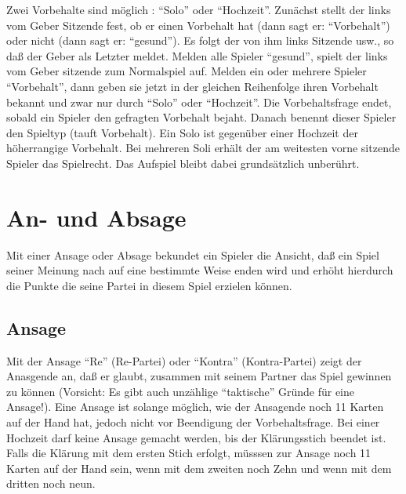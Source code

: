 \documentclass[12pt]{scrartcl}
\begin{document}
Zwei Vorbehalte sind möglich : "`Solo"' oder "`Hochzeit"'. Zunächst stellt der links vom Geber Sitzende fest, ob er einen Vorbehalt hat (dann sagt er: "`Vorbehalt"') oder nicht (dann sagt er: "`gesund"'). Es folgt der von ihm links Sitzende usw., so daß der Geber als Letzter meldet. Melden alle Spieler "`gesund"', spielt der links vom Geber sitzende zum Normalspiel auf. Melden ein oder mehrere Spieler "`Vorbehalt"', dann geben sie jetzt in der gleichen Reihenfolge ihren Vorbehalt bekannt und zwar nur durch "`Solo"' oder "`Hochzeit"'. Die Vorbehaltsfrage endet, sobald ein Spieler den gefragten Vorbehalt bejaht. Danach benennt dieser Spieler den Spieltyp (tauft Vorbehalt). Ein Solo ist gegenüber einer Hochzeit der höherrangige Vorbehalt. Bei mehreren Soli erhält der am weitesten vorne sitzende Spieler das Spielrecht. Das Aufspiel bleibt dabei grundsätzlich unberührt.

\section{An- und Absage}
Mit einer Ansage oder Absage bekundet ein Spieler die Ansicht, daß ein Spiel seiner Meinung nach auf eine bestimmte Weise enden wird und erhöht hierdurch die Punkte die seine Partei in diesem Spiel erzielen können.

\subsection{Ansage}
Mit der Ansage "`Re"' (Re-Partei) oder "`Kontra"' (Kontra-Partei) zeigt der Anasgende an, daß er glaubt, zusammen mit seinem Partner das Spiel gewinnen zu können (Vorsicht: Es gibt auch unzählige "`taktische"' Gründe für eine Ansage!). Eine Ansage ist solange möglich, wie der Ansagende noch 11 Karten auf der Hand hat, jedoch nicht vor Beendigung der Vorbehaltsfrage. Bei einer Hochzeit darf keine Ansage gemacht werden, bis der Klärungsstich beendet ist. Falls die Klärung mit dem ersten Stich erfolgt, müsssen zur Ansage noch 11 Karten auf der Hand sein, wenn mit dem zweiten noch Zehn und wenn mit dem dritten noch neun.
\end{document}
